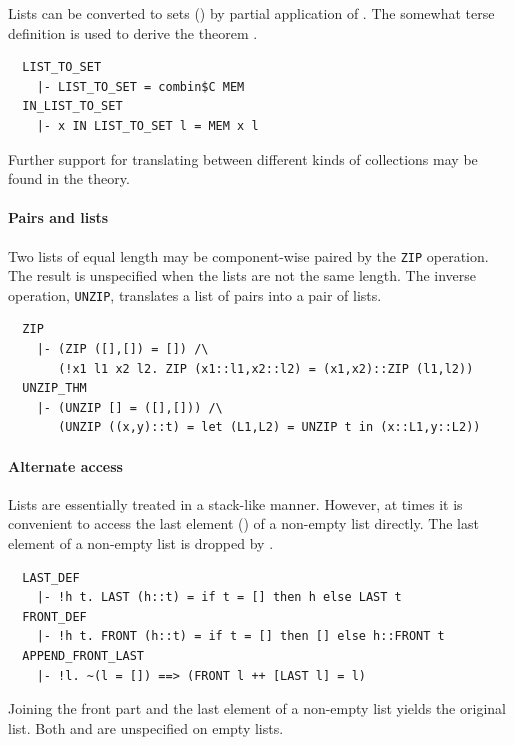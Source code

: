 Lists can be converted to sets () by partial
application of . The somewhat terse definition is used to
derive the theorem .
%
\begin{hol}
\begin{verbatim}
  LIST_TO_SET
    |- LIST_TO_SET = combin$C MEM
  IN_LIST_TO_SET
    |- x IN LIST_TO_SET l = MEM x l
\end{verbatim}
\end{hol}
%
Further support for translating between different kinds of
collections may be found in the  theory.

\paragraph {Pairs and lists}

Two lists of equal length may be component-wise paired by
the {\small\verb+ZIP+} operation. The result is unspecified
when the lists are not the same length. The inverse operation,
{\small\verb+UNZIP+}, translates a list of pairs into a pair of
lists.
\begin{hol}
\begin{verbatim}
  ZIP
    |- (ZIP ([],[]) = []) /\
       (!x1 l1 x2 l2. ZIP (x1::l1,x2::l2) = (x1,x2)::ZIP (l1,l2))
  UNZIP_THM
    |- (UNZIP [] = ([],[])) /\
       (UNZIP ((x,y)::t) = let (L1,L2) = UNZIP t in (x::L1,y::L2))
\end{verbatim}
\end{hol}

\paragraph {Alternate access}
%
Lists are essentially treated in a stack-like manner. However, at
times it is convenient to access the last element
(\holtxt{LAST}) of a non-empty list directly. The last element
of a non-empty list is dropped by \holtxt{FRONT}.
\begin{hol}
\begin{verbatim}
  LAST_DEF
    |- !h t. LAST (h::t) = if t = [] then h else LAST t
  FRONT_DEF
    |- !h t. FRONT (h::t) = if t = [] then [] else h::FRONT t
  APPEND_FRONT_LAST
    |- !l. ~(l = []) ==> (FRONT l ++ [LAST l] = l)
\end{verbatim}
\end{hol}
%
Joining the front part and the last element of a non-empty list yields
the original list.  Both  and 
are unspecified on empty lists.


